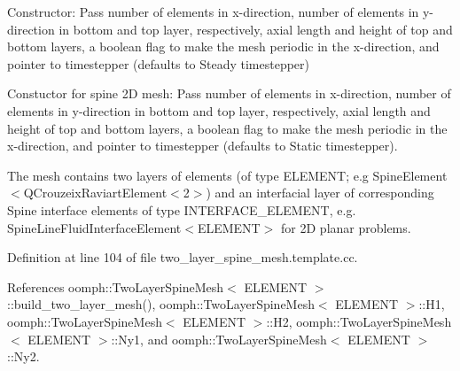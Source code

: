 Constructor\+: Pass number of elements in x-\/direction, number of elements in y-\/direction in bottom and top layer, respectively, axial length and height of top and bottom layers, a boolean flag to make the mesh periodic in the x-\/direction, and pointer to timestepper (defaults to Steady timestepper) 

Constuctor for spine 2D mesh\+: Pass number of elements in x-\/direction, number of elements in y-\/direction in bottom and top layer, respectively, axial length and height of top and bottom layers, a boolean flag to make the mesh periodic in the x-\/direction, and pointer to timestepper (defaults to Static timestepper).

The mesh contains two layers of elements (of type E\+L\+E\+M\+E\+NT; e.\+g Spine\+Element$<$Q\+Crouzeix\+Raviart\+Element$<$2$>$) and an interfacial layer of corresponding Spine interface elements of type I\+N\+T\+E\+R\+F\+A\+C\+E\+\_\+\+E\+L\+E\+M\+E\+NT, e.\+g. Spine\+Line\+Fluid\+Interface\+Element$<$\+E\+L\+E\+M\+E\+N\+T$>$ for 2D planar problems. 

Definition at line 104 of file two\+\_\+layer\+\_\+spine\+\_\+mesh.\+template.\+cc.



References oomph\+::\+Two\+Layer\+Spine\+Mesh$<$ E\+L\+E\+M\+E\+N\+T $>$\+::build\+\_\+two\+\_\+layer\+\_\+mesh(), oomph\+::\+Two\+Layer\+Spine\+Mesh$<$ E\+L\+E\+M\+E\+N\+T $>$\+::\+H1, oomph\+::\+Two\+Layer\+Spine\+Mesh$<$ E\+L\+E\+M\+E\+N\+T $>$\+::\+H2, oomph\+::\+Two\+Layer\+Spine\+Mesh$<$ E\+L\+E\+M\+E\+N\+T $>$\+::\+Ny1, and oomph\+::\+Two\+Layer\+Spine\+Mesh$<$ E\+L\+E\+M\+E\+N\+T $>$\+::\+Ny2.

\mbox{\label{classoomph_1_1TwoLayerSpineMesh_a374454978976c3873a89bedc688b983f}} 
